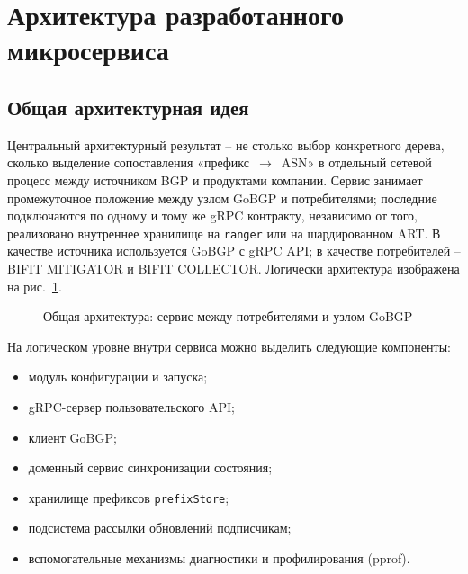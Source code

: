 \section{Архитектура разработанного микросервиса}
\label{sec:architecture}

\subsection{Общая архитектурная идея}

Центральный архитектурный результат -- не столько выбор конкретного
дерева, сколько выделение сопоставления «префикс~$\rightarrow$~ASN» в
отдельный сетевой процесс между источником BGP и продуктами компании.
Сервис занимает промежуточное положение между узлом GoBGP и
потребителями; последние подключаются по одному и тому же gRPC контракту,
независимо от того, реализовано внутреннее хранилище на \texttt{ranger} или на
шардированном ART. В качестве источника используется GoBGP с gRPC API;
в качестве потребителей -- BIFIT MITIGATOR и BIFIT COLLECTOR. Логически
архитектура изображена на рис.~\ref{fig:arch-top}.

\begin{figure}[ht]
\centering
{}
\caption{Общая архитектура: сервис между потребителями и узлом GoBGP}
\label{fig:arch-top}
\end{figure}

На логическом уровне внутри сервиса можно выделить следующие
компоненты:

\begin{itemize}
\item модуль конфигурации и запуска;
\item gRPC-сервер пользовательского API;
\item клиент GoBGP;
\item доменный сервис синхронизации состояния;
\item хранилище префиксов \texttt{prefixStore};
\item подсистема рассылки обновлений подписчикам;
\item вспомогательные механизмы диагностики и профилирования (pprof).
\end{itemize}

